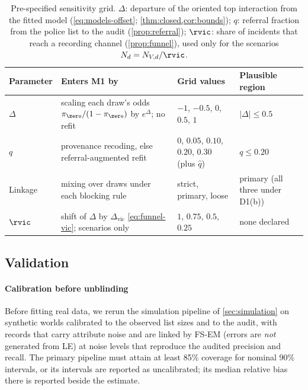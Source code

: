 \begin{table}[tbp]
\centering
\caption{Pre-specified sensitivity grid. $\Delta$: departure of the oriented top interaction from the fitted model (\cref{eq:models-offset}; \cref{thm:closed,cor:bounds}); $q$: referral fraction from the police list to the audit (\cref{prop:referral}); $\rvic$: share of incidents that reach a recording channel (\cref{prop:funnel}), used only for the scenarios $N_d=N_{V,d}/\rvic$.}\label{tab:plan-sens}
\small
\begin{tabularx}{\textwidth}{@{}l>{\raggedright\arraybackslash}X>{\raggedright\arraybackslash}p{3.0cm}>{\raggedright\arraybackslash}p{3.2cm}@{}}
\toprule
Parameter & Enters M1 by & Grid values & Plausible region \\
\midrule
$\Delta$ & scaling each draw's odds $\pi_{\zero}/(1-\pi_{\zero})$ by $e^{\Delta}$; no refit & $-1$, $-0.5$, $0$, $0.5$, $1$ & $|\Delta|\le 0.5$ \\
$q$ & provenance recoding, else referral-augmented refit & $0$, $0.05$, $0.10$, $0.20$, $0.30$ (plus $\hat q$) & $q\le 0.20$ \\
Linkage & mixing over draws under each blocking rule & strict, primary, loose & primary (all three under D1(b)) \\
$\rvic$ & shift of $\Delta$ by $\Delta_{\mathrm{vic}}$ \eqref{eq:funnel-vic}; scenarios only & $1$, $0.75$, $0.5$, $0.25$ & none declared \\
\bottomrule
\end{tabularx}
\end{table}

\subsection{Validation}\label{sec:plan-validation}

\paragraph{Calibration before unblinding}
Before fitting real data, we rerun the simulation pipeline of \cref{sec:simulation} on synthetic worlds calibrated to the observed list sizes and to the audit, with records that carry attribute noise and are linked by FS-EM (errors are \emph{not} generated from LE) at noise levels that reproduce the audited precision and recall. The primary pipeline must attain at least 85\% coverage for nominal 90\% intervals, or its intervals are reported as uncalibrated; its median relative bias there is reported beside the estimate.

